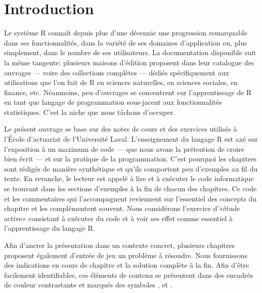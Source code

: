
\chapter*{Introduction}

Le système R connaît depuis plus d'une décennie une progression
remarquable dans ses fonctionnalités, dans la variété de ses domaines
d'application ou, plus simplement, dans le nombre de ses utilisateurs.
La documentation disponible suit la même tangente: plusieurs maisons
d'édition proposent dans leur catalogue des ouvrages --- voire des
collections complètes --- dédiés spécifiquement aux utilisations que
l'on fait de R en sciences naturelles, en sciences sociales, en
finance, etc. Néanmoins, peu d'ouvrages se concentrent sur
l'apprentissage de R en tant que langage de programmation sous-jacent
aux fonctionnalités statistiques. C'est la niche que nous tâchons
d'occuper.

Le présent ouvrage se base sur des notes de cours et des exercices
utilisés à l'École d'actuariat de l'Université Laval. L'enseignement
du langage R est axé sur l'exposition à un maximum de code --- que
nous avons la prétention de croire bien écrit --- et sur la pratique
de la programmation. C'est pourquoi les chapitres sont rédigés de
manière synthétique et qu'ils comportent peu d'exemples au fil du
texte. En revanche, le lecteur est appelé à lire et à exécuter le code
informatique se trouvant dans les sections d'exemples à la fin de
chacun des chapitres. Ce code et les commentaires qui l'accompagnent
reviennent sur l'essentiel des concepts du chapitre et les
complémentent souvent. Nous considérons l'exercice d'«étude active»
consistant à exécuter du code et à voir ses effet comme essentiel à
l'apprentissage du langage R.

Afin d'ancrer la présentation dans un contexte concret, plusieurs
chapitres proposent également d'entrée de jeu un problème à résoudre.
Nous fournissons des indications en cours de chapitre et la solution
complète à la fin. Afin d'être facilement identifiables, ces éléments
de contenu se présentent dans des encadrés de couleur contrastante et
marqués des symboles {\faCogs}, {\faBolt} et {\faLightbulbO}.

